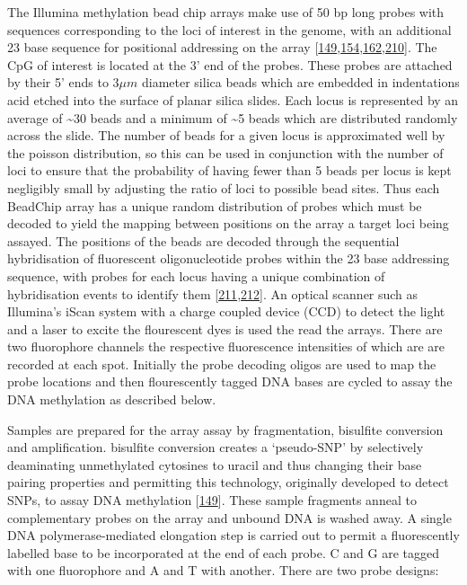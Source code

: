 \documentclass[
]{book}
\begin{document}
The Illumina methylation bead chip arrays make use of 50 bp long probes with sequences corresponding to the loci of interest in the genome, with an additional 23 base sequence for positional addressing on the array {[}\protect\hyperlink{ref-Bibikova2006}{149},\protect\hyperlink{ref-Bibikova2009}{154},\protect\hyperlink{ref-Bibikova2011}{162},\protect\hyperlink{ref-Moran2015}{210}{]}.
The CpG of interest is located at the 3' end of the probes.
These probes are attached by their 5' ends to \(3\mu m\) diameter silica beads which are embedded in indentations acid etched into the surface of planar silica slides.
Each locus is represented by an average of \textasciitilde30 beads and a minimum of \textasciitilde5 beads which are distributed randomly across the slide.
The number of beads for a given locus is approximated well by the poisson distribution, so this can be used in conjunction with the number of loci to ensure that the probability of having fewer than 5 beads per locus is kept negligibly small by adjusting the ratio of loci to possible bead sites.
Thus each BeadChip array has a unique random distribution of probes which must be decoded to yield the mapping between positions on the array a target loci being assayed.
The positions of the beads are decoded through the sequential hybridisation of fluorescent oligonucleotide probes within the 23 base addressing sequence, with probes for each locus having a unique combination of hybridisation events to identify them {[}\protect\hyperlink{ref-Gunderson2004}{211},\protect\hyperlink{ref-Michael1998}{212}{]}.
An optical scanner such as Illumina's iScan system with a charge coupled device (CCD) to detect the light and a laser to excite the flourescent dyes is used the read the arrays.
There are two fluorophore channels the respective fluorescence intensities of which are are recorded at each spot.
Initially the probe decoding oligos are used to map the probe locations and then flourescently tagged DNA bases are cycled to assay the DNA methylation as described below.

Samples are prepared for the array assay by fragmentation, bisulfite conversion and amplification.
bisulfite conversion creates a `pseudo-SNP' by selectively deaminating unmethylated cytosines to uracil and thus changing their base pairing properties and permitting this technology, originally developed to detect SNPs, to assay DNA methylation {[}\protect\hyperlink{ref-Bibikova2006}{149}{]}.
These sample fragments anneal to complementary probes on the array and unbound DNA is washed away.
A single DNA polymerase-mediated elongation step is carried out to permit a fluorescently labelled base to be incorporated at the end of each probe.
C and G are tagged with one fluorophore and A and T with another.
There are two probe designs:
\end{document}
